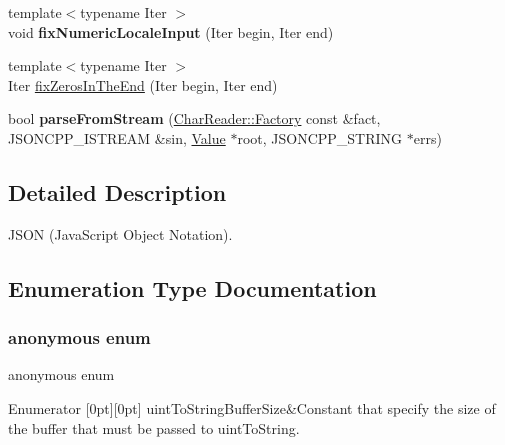 \begin{DoxyCompactItemize}
\item 
\mbox{\label{namespaceJson_adc6272a7aca28093bc7232ada8607fe4}} 
{\footnotesize template$<$typename Iter $>$ }\\void {\bfseries fix\+Numeric\+Locale\+Input} (Iter begin, Iter end)
\item 
{\footnotesize template$<$typename Iter $>$ }\\Iter \hyperlink{namespaceJson_ae7b26e19e40cb18a11568cb477ff1743}{fix\+Zeros\+In\+The\+End} (Iter begin, Iter end)
\item 
\mbox{\label{namespaceJson_a38f903cfdb57a6c4e86a7dcc42f3712c}} 
bool {\bfseries parse\+From\+Stream} (\hyperlink{classJson_1_1CharReader_1_1Factory}{Char\+Reader\+::\+Factory} const \&fact, J\+S\+O\+N\+C\+P\+P\+\_\+\+I\+S\+T\+R\+E\+AM \&sin, \hyperlink{classJson_1_1Value}{Value} $\ast$root, J\+S\+O\+N\+C\+P\+P\+\_\+\+S\+T\+R\+I\+NG $\ast$errs)
\end{DoxyCompactItemize}


\subsection{Detailed Description}
J\+S\+ON (Java\+Script Object Notation). 

\subsection{Enumeration Type Documentation}
\mbox{\label{namespaceJson_a2aacab54ef6fc18e833fbd4982a0a23a}} 
\subsubsection{\texorpdfstring{anonymous enum}{anonymous enum}}
{\footnotesize\ttfamily anonymous enum}

\begin{DoxyEnumFields}{Enumerator}
[0pt][0pt]{}\mbox{\label{namespaceJson_a2aacab54ef6fc18e833fbd4982a0a23aae4f2008c7919f20d81286121d1374424}} 
uint\+To\+String\+Buffer\+Size&Constant that specify the size of the buffer that must be passed to uint\+To\+String. \\
\hline

\end{DoxyEnumFields}
\mbox{\label{namespaceJson_a4fc417c23905b2ae9e2c47d197a45351}} 
